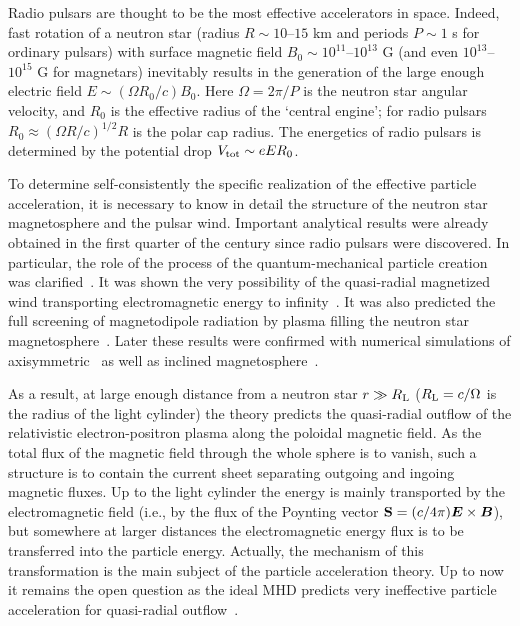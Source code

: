 \documentclass[useAMS,usenatbib]{mn2e}
\begin{document}
Radio pulsars are thought to be the most effective accelerators in space.
Indeed, fast rotation of a neutron star (radius $R \sim 10$--$15$ km and
periods $P \sim 1$ s for ordinary pulsars) with surface magnetic field
$B_{0} \sim 10^{11}$--$10^{13}$ G (and even  $10^{13}$--$10^{15}$ G for
magnetars) inevitably results in the generation of the large enough electric
field $E \sim (\Omega R_{0}/c) B_{0}$. Here $\Omega = 2 \pi/P$ is the
neutron star angular velocity, and $R_{0}$ is the effective radius of the 
`central engine'; for radio pulsars $R_{0} \approx (\Omega R/c)^{1/2} R$
is the polar cap radius. The energetics of radio pulsars is determined by the
potential drop $V_{\rm tot} \sim e E R_{0}$.

To determine self-consistently the specific realization of the effective
particle acceleration, it is necessary to know in detail the structure of the
neutron star magnetosphere and the pulsar wind. Important analytical results
were already obtained in the first quarter of the century since radio pulsars
were discovered. In particular, the role of the process of the quantum-mechanical
particle creation was clarified~\citep{sturrock71, rs75, 1981ApJ...248.1099A}. 
It was shown the very possibility of the quasi-radial magnetized wind transporting 
electromagnetic energy to infinity~\citep{1973ApJ...180L.133M, 1975MNRAS.170..551B, 
1999A&A...349.1017B}. It was also predicted the full screening of magnetodipole 
radiation by plasma filling the neutron star magnetosphere~\citep{BGI}. Later 
these results were confirmed with numerical simulations of axisymmetric~\citep{ckf99, 
2006MNRAS.368.1055T, 2005PhRvL..94b1101G, 2006MNRAS.367...19K} as well as inclined 
magnetosphere~\citep{2012MNRAS.420.2793K, SashaMHD}.

As a result, at large enough distance from a neutron star $r \gg R_{\rm L}$
($R_{\rm L} = c/\Omega$ is the radius of the light cylinder) the theory predicts
the quasi-radial outflow of the relativistic electron-positron plasma along the
poloidal magnetic field. As the total flux of the magnetic field
through the whole sphere is to vanish, such a structure is to contain the current
sheet separating outgoing and ingoing magnetic fluxes. Up to the light cylinder the
energy is mainly transported by the electromagnetic field (i.e., by the flux of the
Poynting vector ${\bf S} = (c/4\pi){\boldsymbol E} \times {\boldsymbol B}$), but somewhere at larger
distances the electromagnetic energy flux is to be transferred into the particle energy.
Actually, the mechanism of this transformation is the main subject of the particle
acceleration theory. Up to now it remains the open question as the ideal MHD predicts
very ineffective particle acceleration for quasi-radial outflow~\citep{1994PASJ...46..123T, bes98}.
\end{document}
